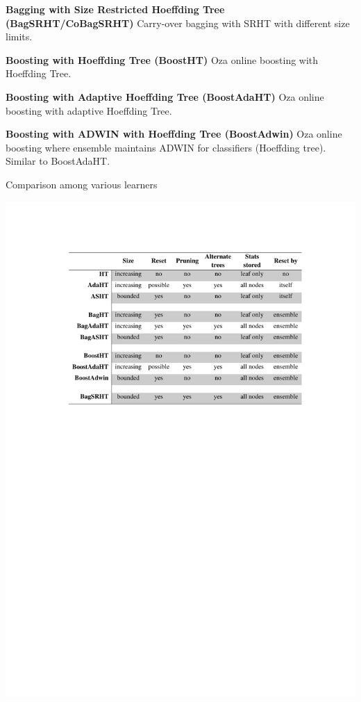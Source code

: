 \textbf{Bagging with Size Restricted Hoeffding Tree (BagSRHT/CoBagSRHT)} Carry-over bagging with SRHT with different size limits.

\textbf{Boosting with Hoeffding Tree (BoostHT)}  Oza online boosting with Hoeffding Tree.

\textbf{Boosting with Adaptive Hoeffding Tree (BoostAdaHT)} Oza online boosting with adaptive Hoeffding Tree.

\textbf{Boosting with ADWIN with Hoeffding Tree (BoostAdwin)} Oza online boosting where ensemble maintains ADWIN for classifiers (Hoeffding tree). Similar to BoostAdaHT.


\begin{table}[htbp]
    \caption{Comparison among various learners}
    \label{tab:treecomp}
    \vspace{-5mm}
    \begin{center}
    \includegraphics{figs/treescomp.pdf}
    \end{center}
\end{table}

